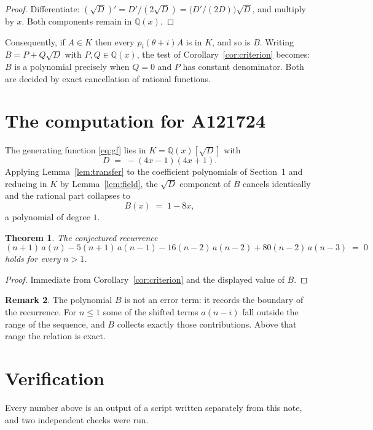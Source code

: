 \documentclass[11pt,a4paper]{article}
\theoremstyle{plain}
\newtheorem{theorem}{Theorem}
\theoremstyle{definition}
\newtheorem{remark}[theorem]{Remark}
\begin{document}
\begin{proof}
Differentiate: $(\sqrt{D})'=D'/(2\sqrt{D})=\bigl(D'/(2D)\bigr)\sqrt{D}$, and multiply by
$x$. Both components remain in $\mathbb{Q}(x)$.
\end{proof}

Consequently, if $A\in K$ then every $p_{i}(\theta+i)A$ is in $K$, and so is $B$. Writing
$B=P+Q\sqrt{D}$ with $P,Q\in\mathbb{Q}(x)$, the test of Corollary~\ref{cor:criterion}
becomes: $B$ is a polynomial precisely when $Q=0$ and $P$ has constant denominator. Both
are decided by exact cancellation of rational functions.

\section{The computation for A121724}

The generating function \eqref{eq:gf} lies in $K=\mathbb{Q}(x)[\sqrt{D}]$ with
\[
D \;=\; - \left(4 x - 1\right) \left(4 x + 1\right) .
\]
Applying Lemma~\ref{lem:transfer} to the coefficient polynomials of Section~1 and reducing
in $K$ by Lemma~\ref{lem:field}, the $\sqrt{D}$ component of $B$ cancels identically and
the rational part collapses to
\[
B(x)\;=\;1 - 8 x ,
\]
a polynomial of degree $1$.

\begin{theorem}
The conjectured recurrence
\[
(n + 1)\,a(n) -  5 \left(n + 1\right)\,a(n-1) -  16 \left(n - 2\right)\,a(n-2) + 80 \left(n - 2\right)\,a(n-3) \;=\;0
\]
holds for every $n>1$.
\end{theorem}

\begin{proof}
Immediate from Corollary~\ref{cor:criterion} and the displayed value of $B$.
\end{proof}

\begin{remark}
The polynomial $B$ is not an error term: it records the boundary of the recurrence. For
$n\le1$ some of the shifted terms $a(n-i)$ fall outside the range of the sequence,
and $B$ collects exactly those contributions. Above that range the relation is exact.
\end{remark}

\section{Verification}

Every number above is an output of a script written separately from this note, and two
independent checks were run.
\end{document}
